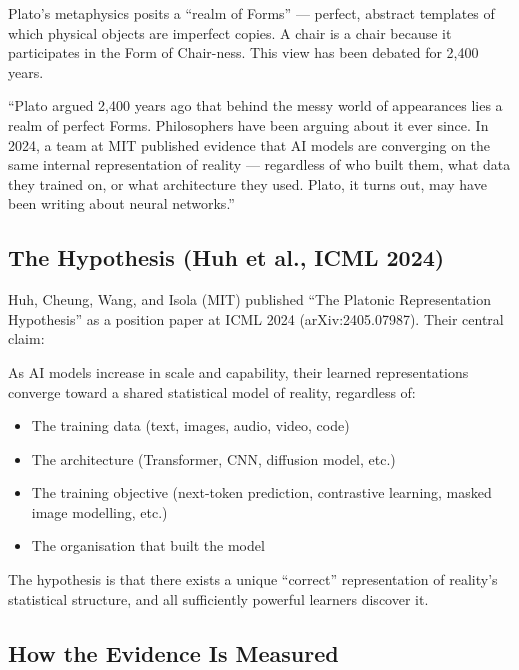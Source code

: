 \documentclass[11pt, a4paper]{article}
\begin{document}
Plato's metaphysics posits a ``realm of Forms'' --- perfect, abstract
templates of which physical objects are imperfect copies. A chair is a
chair because it participates in the Form of Chair-ness. This view has
been debated for 2,400 years.

\begin{speakingnote}
``Plato argued 2,400 years ago that behind the messy world of appearances
lies a realm of perfect Forms. Philosophers have been arguing about it
ever since. In 2024, a team at MIT published evidence that AI models are
converging on the same internal representation of reality --- regardless
of who built them, what data they trained on, or what architecture they
used. Plato, it turns out, may have been writing about neural networks.''
\end{speakingnote}


\subsection{The Hypothesis (Huh et al., ICML 2024)}

Huh, Cheung, Wang, and Isola (MIT) published ``The Platonic Representation
Hypothesis'' as a position paper at ICML 2024 (arXiv:2405.07987). Their
central claim:

\begin{keyinsight}[title={The Platonic Representation Hypothesis}]
As AI models increase in scale and capability, their learned
representations converge toward a shared statistical model of reality,
regardless of:
\begin{itemize}[leftmargin=2em]
  \item The training data (text, images, audio, video, code)
  \item The architecture (Transformer, CNN, diffusion model, etc.)
  \item The training objective (next-token prediction, contrastive
    learning, masked image modelling, etc.)
  \item The organisation that built the model
\end{itemize}
The hypothesis is that there exists a unique ``correct'' representation
of reality's statistical structure, and all sufficiently powerful learners
discover it.
\end{keyinsight}

\subsection{How the Evidence Is Measured}
\end{document}
